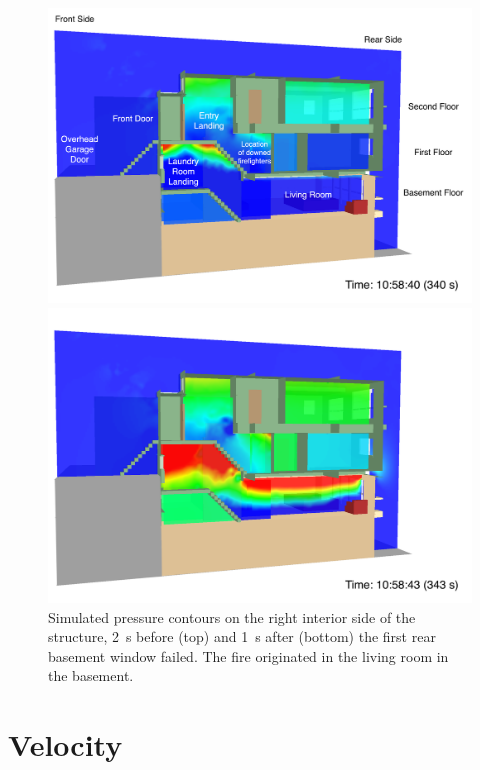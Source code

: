 \documentclass[12pt,oneside]{book}
\begin{document}
\begin{figure}[!ht]
\includegraphics[width=5.5in]{../Figures/SMV_Pres_340_s}

\includegraphics[width=5.5in]{../Figures/SMV_Pres_343_s}

\caption[Simulated pressure contours on the right interior side of the structure.]
{Simulated pressure contours on the right interior side of the structure, 2~s before (top) and 1~s after (bottom) the first rear basement window failed. The fire originated in the living room in the basement.}
\label{fig:smv_pressure}
\end{figure}


\clearpage


\section{Velocity}
\label{sec:velocity}
\end{document}
